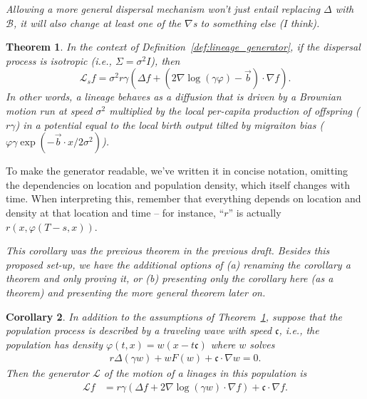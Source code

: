 \documentclass[12pt]{article}
\newtheorem{theorem}{Theorem}[section]
\newtheorem{corollary}[theorem]{Corollary}
\newcommand{\grad}{\nabla}
\newcommand{\DG}{\mathcal{B}}  %
\newcommand{\meanq}{\vec b}    %
\newcommand{\covq}{\Sigma}     %
\newcommand{\wavespeed}{\mathfrak{c}}    %
\newcommand{\Lgen}{\mathcal{L}}    %
\newcommand{\comment}[1]{{\color{blue} \it #1}}
\begin{document}
\comment{
    Allowing a more general dispersal mechanism won't just entail replacing $\Delta$ with $\DG$,
    it will also change at least one of the $\grad$s to something else (I think).
}

\begin{theorem} \label{thm:lineages}
    In the context of Definition~\ref{def:lineage_generator},
    if the dispersal process is isotropic (i.e., $\covq = \sigma^2 I$),
    then
    \begin{equation}
        \label{eqn:lineage_generator}
        \Lgen_s f
        =
        \sigma^2 r \gamma
        \left(
            \Delta f
            +
            \left(
                2 \grad \log(\gamma \varphi)
                - \meanq
            \right)
            \cdot \grad f
        \right) .
    \end{equation}
    In other words, 
    a lineage behaves as a diffusion
    that is driven by a Brownian motion 
    run at speed $\sigma^2$ multiplied by the local per-capita production of offspring ($r \gamma$)
    in a potential equal to the local birth output tilted by migraiton bias
    ($\varphi \gamma \exp(-\meanq \cdot x / 2 \sigma^2)$).
\end{theorem}

To make the generator readable, we've written it in concise notation,
omitting the dependencies on location and population density,
which itself changes with time.
When interpreting this,
remember that everything depends on location and density at that location and time --
for instance, ``$r$'' is actually $r(x, \varphi(T-s, x))$.

\comment{This corollary was the previous theorem in the previous draft.
    Besides this proposed set-up, we have the additional options of
    (a) renaming the corollary a theorem and only proving it,
    or (b) presenting only the corollary here (as a theorem)
    and presenting the more general theorem later on.
}

\begin{corollary} \label{cor:wavefront}
    In addition to the assumptions of Theorem~\ref{thm:lineages},
    suppose that the population process is described by a traveling wave with speed $\wavespeed$,
    i.e., the population has density
    $\varphi(t, x) = w(x - t \wavespeed)$
    where $w$ solves
    \begin{align*}
        r \Delta (\gamma w) + w F(w) + \wavespeed \cdot \grad w = 0 .
    \end{align*}
    Then the generator $\Lgen$
    of the motion of a linages in this population is
    \begin{align}
        \Lgen f
        &=
        r \gamma
        \left(
            \Delta f
            +
            2 \grad \log (\gamma w)
            \cdot \grad f
        \right)
        + \wavespeed \cdot \grad f .
    \end{align}
\end{corollary}
\end{document}
